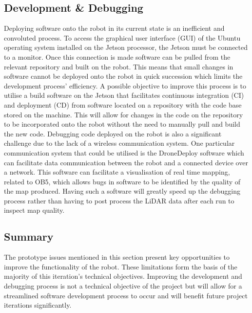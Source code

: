 \subsection{Development \& Debugging} %
\label{sec:dev-debug}
Deploying software onto the robot in its current state is an inefficient and convoluted process. To access the graphical user interface (GUI) of the Ubuntu operating system installed on the Jetson processor, the Jetson must be connected to a monitor. Once this connection is made software can be pulled from the relevant repository and built on the robot. This means that small changes in software cannot be deployed onto the robot in quick succession which limits the development process' efficiency. A possible objective to improve this process is to utilise a build software on the Jetson that facilitates continuous integration (CI) and deployment (CD) from software located on a repository with the code base stored on the machine. This will allow for changes in the code on the repository to be incorporated onto the robot without the need to manually pull and build the new code. Debugging code deployed on the robot is also a significant challenge due to the lack of a wireless communication system. One particular communication system that could be utilised is the DroneDeploy software which can facilitate data communication between the robot and a connected device over a network. This software can facilitate a visualisation of real time mapping, related to OB5, which allows bugs in software to be identified by the quality of the map produced. Having such a software will greatly speed up the debugging process rather than having to post process the LiDAR data after each run to inspect map quality.

\subsection{Summary}
The prototype issues mentioned in this section present key opportunities to improve the functionality of the robot. These limitations form the basis of the majority of this iteration's technical objectives. Improving the development and debugging process is not a technical objective of the project but will allow for a streamlined software development process to occur and will benefit future project iterations significantly.